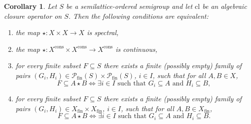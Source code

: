 \documentclass[10pt, reqno]{amsart}
\theoremstyle{plain}
\newtheorem{corollary}[theorem]{Corollary}
\theoremstyle{definition}
\begin{document}
\begin{corollary}\label{equivalent_conditions_on_spectrality}
    Let $S$ be a semilattice-ordered semigroup and let $\mathrm{cl}$ be an algebraic closure operator on $S$. Then the following conditions are equivalent: 
    \begin{enumerate}[label=(\arabic*)]
        \item the map $\star : X \times X \rightarrow X$ is spectral, 
        \item the map $\star: X^\mathrm{cons}\times X^\mathrm{cons}\to X^\mathrm{cons}$ is continuous, 
        \item for every finite subset $F \subseteq S$ there exists a finite (possibly empty) family of pairs $(G_i, H_i) \in \mathcal{P}_\mathrm{fin}(S) \times \mathcal{P}_\mathrm{fin}(S)$, $i \in I$, such that for all $A, B\in X$, 
        \begin{equation*}
            F \subseteq A \star B \iff \exists i \in I \text{ such that } G_i \subseteq A \text{ and } H_i\subseteq B, 
        \end{equation*}
        \item for every finite subset $F \subseteq S$ there exists a finite (possibly empty) family of pairs $(G_i, H_i) \in X_\mathrm{fin} \times X_\mathrm{fin}$, $i \in I$, such that for all $A, B\in X_\mathrm{fin}$, 
        \begin{equation*}
            F \subseteq A \star B \iff \exists i\in I \text{ such that } G_i \subseteq A\text{ and } H_i \subseteq B.
        \end{equation*}
    \end{enumerate}
\end{corollary}
\end{document}
